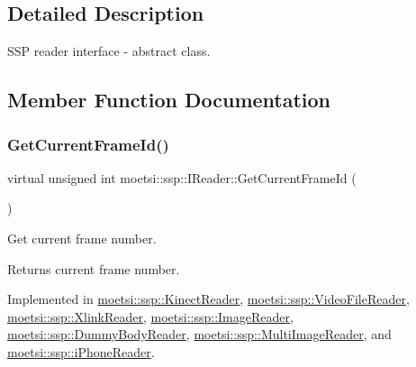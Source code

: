 \subsection{Detailed Description}
S\+SP reader interface -\/ abstract class. 

\subsection{Member Function Documentation}
\mbox{\label{classmoetsi_1_1ssp_1_1IReader_ac292d83eb06dee277baaa06e281a562d}} 
\subsubsection{\texorpdfstring{Get\+Current\+Frame\+Id()}{GetCurrentFrameId()}\hspace{0.1cm}{\footnotesize\ttfamily [1/2]}}
{\footnotesize\ttfamily virtual unsigned int moetsi\+::ssp\+::\+I\+Reader\+::\+Get\+Current\+Frame\+Id (\begin{DoxyParamCaption}{ }\end{DoxyParamCaption})\hspace{0.3cm}{\ttfamily [pure virtual]}}



Get current frame number. 

\begin{DoxyReturn}{Returns}
current frame number. 
\end{DoxyReturn}


Implemented in \hyperlink{classmoetsi_1_1ssp_1_1KinectReader_aa17e268723c41bdad5082575decb28eb}{moetsi\+::ssp\+::\+Kinect\+Reader}, \hyperlink{classmoetsi_1_1ssp_1_1VideoFileReader_aef5c92da2645cddc7e4ffcfd34ad4b8a}{moetsi\+::ssp\+::\+Video\+File\+Reader}, \hyperlink{classmoetsi_1_1ssp_1_1XlinkReader_ae11a3b07f2f036f87bc3d96685f61dae}{moetsi\+::ssp\+::\+Xlink\+Reader}, \hyperlink{classmoetsi_1_1ssp_1_1ImageReader_a386125736df9f25e5c4312bb679ff031}{moetsi\+::ssp\+::\+Image\+Reader}, \hyperlink{classmoetsi_1_1ssp_1_1DummyBodyReader_a91d5b81c241103ffde276d354a34d7db}{moetsi\+::ssp\+::\+Dummy\+Body\+Reader}, \hyperlink{classmoetsi_1_1ssp_1_1MultiImageReader_a994eea20e9682c2f4afc9303a34c76f3}{moetsi\+::ssp\+::\+Multi\+Image\+Reader}, and \hyperlink{classmoetsi_1_1ssp_1_1iPhoneReader_a78792c6319743aed3ef2afc96fe16485}{moetsi\+::ssp\+::i\+Phone\+Reader}.


